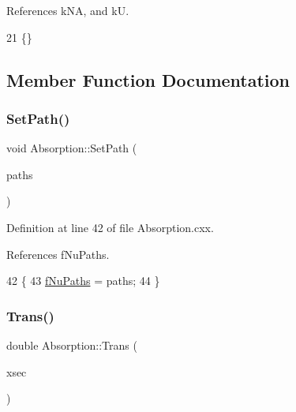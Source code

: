 References k\+NA, and kU.


\begin{DoxyCode}
21 \{\}
\end{DoxyCode}


\subsection{Member Function Documentation}
\mbox{\label{classOscProb_1_1Absorption_ad3c552785adac11af8b509fbf355c158}} 
\subsubsection{\texorpdfstring{Set\+Path()}{SetPath()}}
{\footnotesize\ttfamily void Absorption\+::\+Set\+Path (\begin{DoxyParamCaption}\item[{std\+::vector$<$ \hyperlink{structOscProb_1_1NuPath}{Osc\+Prob\+::\+Nu\+Path} $>$}]{paths }\end{DoxyParamCaption})\hspace{0.3cm}{\ttfamily [virtual]}}



Definition at line 42 of file Absorption.\+cxx.



References f\+Nu\+Paths.


\begin{DoxyCode}
42                                                       \{
43   \hyperlink{classOscProb_1_1Absorption_aabe51d0748a0d48972780811e90acf69}{fNuPaths} = paths;
44 \}
\end{DoxyCode}
\mbox{\label{classOscProb_1_1Absorption_afe0c4cfc50a6f6434554fbb75c4272ac}} 
\subsubsection{\texorpdfstring{Trans()}{Trans()}}
{\footnotesize\ttfamily double Absorption\+::\+Trans (\begin{DoxyParamCaption}\item[{double}]{xsec }\end{DoxyParamCaption})\hspace{0.3cm}{\ttfamily [virtual]}}



